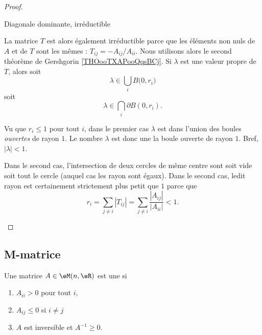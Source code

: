 \begin{proof}
\begin{subproof}
    \item[Diagonale dominante, irréductible]

        La matrice \( T\) est alors également irréductible parce que les éléments non nuls de \( A\) et de \( T\) sont les mêmes : \( T_{ij}=-A_{ij}/A_{ii}\). Nous utilisons alors le second théorème de Gershgorin \ref{THOooTXAPooQqsBCj}. Si \( \lambda\) est une valeur propre de \( T\), alors soit
        \begin{equation}
            \lambda\in\bigcup_iB\big( 0,r_i \big)
        \end{equation}
        soit
        \begin{equation}
            \lambda\in\bigcap_i\partial B(0,r_i).
        \end{equation}

        Vu que \( r_i\leq 1\) pour tout \( i\), dans le premier cas \( \lambda\) est dans l'union des boules \emph{ouvertes} de rayon \( 1\). Le nombre \( \lambda\) est donc une la boule ouverte de rayon \( 1\). Bref, \( | \lambda |<1\).

        Dans le second cas, l'intersection de deux cercles de même centre sont soit vide soit tout le cercle (auquel cas les rayon sont égaux). Dans le second cas, ledit rayon est certainement strictement plus petit que \( 1\) parce que
        \begin{equation}
            r_i=\sum_{j\neq i}| T_{ij} |=\sum_{j\neq i}\frac{ | A_{ij} | }{ | A_{ii} | }<1.
        \end{equation}
    \end{subproof}
\end{proof}

\subsection{M-matrice}

\begin{definition}      \label{DEFooZAWWooEAujPy}
    Une matrice \( A\in \eM(n,\eR)\) est une  si
    \begin{enumerate}
        \item
            \( A_{ii}>0\) pour tout \( i\),
        \item
            \( A_{ij}\leq 0\) si \( i\neq j\)
        \item
            \( A\) est inversible et \( A^{-1}\geq 0\).
    \end{enumerate}
\end{definition}


